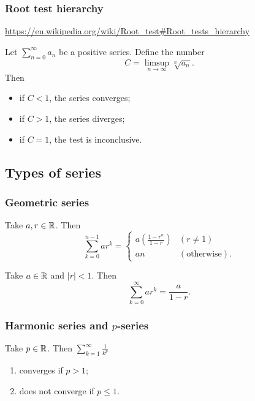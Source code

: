\subsubsection{Root test hierarchy}
\url{https://en.wikipedia.org/wiki/Root_test#Root_tests_hierarchy}

\begin{proposition} \label{rootTest}
Let $\sum_{n=0}^\infty a_n$ be a positive series. Define the number
\[ C = \limsup_{n\to \infty}\sqrt[n]{a_n}. \]
Then
\begin{itemize}
\item if $C<1$, the series converges;
\item if $C>1$, the series diverges;
\item if $C=1$, the test is inconclusive.
\end{itemize}
\end{proposition}

\subsection{Types of series}
\subsubsection{Geometric series}
\begin{proposition}
Take $a,r\in \mathbb{R}$. Then
\[ \sum_{k=0}^{n-1}ar^k = \begin{cases}
a\left(\frac{1-r^n}{1-r}\right) & (r\neq 1) \\
an & (\text{otherwise}).
\end{cases} \]
\end{proposition}
\begin{corollary}
Take $a\in \mathbb{R}$ and $|r|<1$. Then
\[ \sum_{k=0}^\infty a r^k = \frac{a}{1-r}. \]
\end{corollary}

\subsubsection{Harmonic series and $p$-series}
\begin{proposition} \label{pseriesConvergence}
Take $p\in \mathbb{R}$. Then $\sum_{k=1}^\infty \frac{1}{k^p}$
\begin{enumerate}
\item converges if $p > 1$;
\item does not converge if $p\leq 1$.
\end{enumerate}
\end{proposition}



